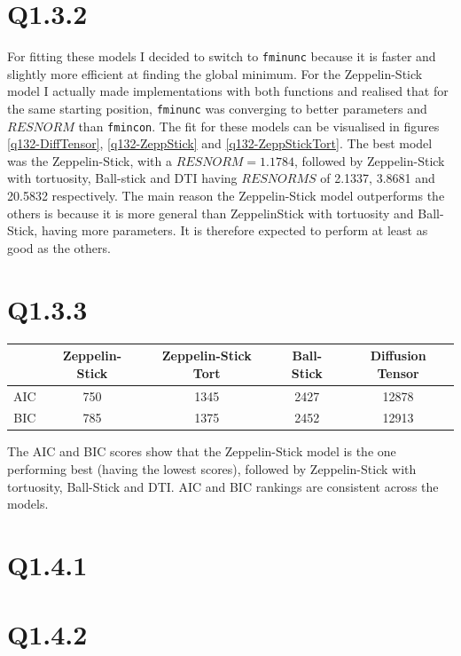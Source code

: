 \documentclass[11pt,a4paper,oneside]{report}
\begin{document}
\section*{Q1.3.2}
For fitting these models I decided to switch to \texttt{fminunc} because it is faster and slightly more efficient at finding the global minimum. For the Zeppelin-Stick model I actually made implementations with both functions and realised that for the same starting position, \texttt{fminunc} was converging to better parameters and $RESNORM$ than \texttt{fmincon}. The fit for these models can be visualised in figures \ref{q132-DiffTensor}, \ref{q132-ZeppStick} and \ref{q132-ZeppStickTort}. The best model was the Zeppelin-Stick, with a $RESNORM=1.1784$, followed by Zeppelin-Stick with tortuosity, Ball-stick and DTI having $RESNORMS$ of 2.1337, 3.8681 and 20.5832 respectively. The main reason the Zeppelin-Stick model outperforms the others is because it is more general than ZeppelinStick with tortuosity and Ball-Stick, having more parameters. It is therefore expected to perform at least as good as the others.


\section*{Q1.3.3}

\begin{center}
\begin{tabular}{c | c | c | c | c}
& Zeppelin-Stick & Zeppelin-Stick Tort & Ball-Stick & Diffusion Tensor\\
\hline
AIC & 750 & 1345 & 2427 & 12878\\
BIC & 785 & 1375 & 2452 & 12913\\
\end{tabular}
\end{center}

The AIC and BIC scores show that the Zeppelin-Stick model is the one performing best (having the lowest scores), followed by Zeppelin-Stick with tortuosity, Ball-Stick and DTI. AIC and BIC rankings are consistent across the models. 


\section*{Q1.4.1}

\section*{Q1.4.2}
\end{document}
